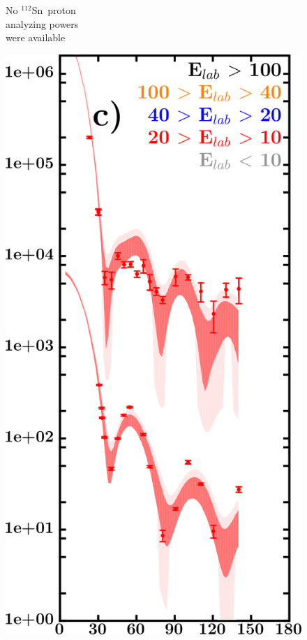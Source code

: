 \documentclass[twocolumn,secnumarabic,amssymb, nobibnotes, aps, prl,
superscriptaddress, nobalancelastpage, draft]{revtex4}
\newcommand{\snTwelve}{\ensuremath{^{112}}S\lowercase{n}}
\begin{document}
\begin{figure}[!htb]
\begin{minipage}{0.4\linewidth}
\begin{minipage}[c]{0.5\linewidth}
        \end{minipage}
        \begin{minipage}[c]{0.45\linewidth}
            \centering
            No \snTwelve\ proton \\
            analyzing powers \\
            were available
        \end{minipage}
        \label{DOM_sn112_proton_elastic}
    \end{minipage}\hspace{6pt}
    \begin{minipage}{0.4\linewidth}
        \centering
        \begin{minipage}[c]{0.5\linewidth}
            \centering
                \includegraphics[width=\linewidth]{figures/sn112_neutronElastic.png}

\end{minipage}
\end{minipage}
\end{figure}
\end{document}
